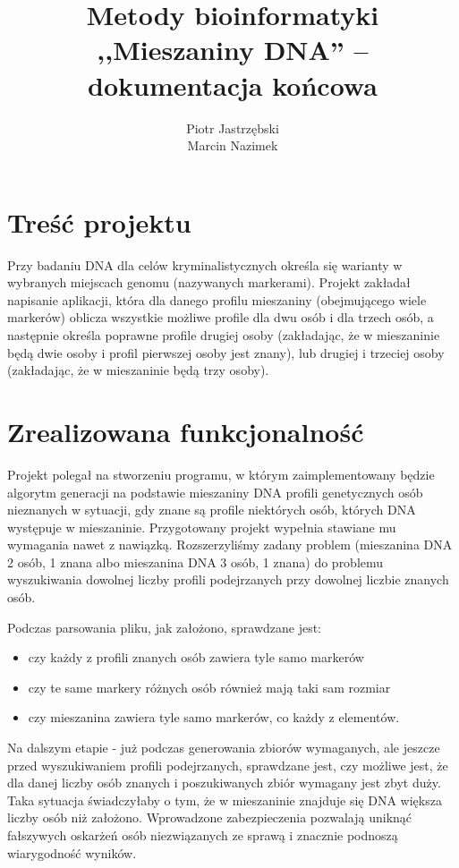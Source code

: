 \documentclass[11pt,a4paper]{article}
\title{Metody bioinformatyki\\ ,,Mieszaniny DNA'' -- dokumentacja końcowa}
\author{Piotr Jastrzębski\\ Marcin Nazimek}
\date{}
\begin{document}
\maketitle

\section{Treść projektu}
Przy badaniu DNA dla celów kryminalistycznych określa się warianty w wybranych miejscach genomu (nazywanych markerami). Projekt zakładał napisanie aplikacji, która dla danego profilu mieszaniny (obejmującego wiele markerów) oblicza wszystkie możliwe profile dla dwu osób i dla trzech osób, a następnie określa poprawne profile drugiej osoby (zakładając, że w mieszaninie będą dwie osoby i profil pierwszej osoby jest znany), lub drugiej i trzeciej osoby (zakładając, że w mieszaninie będą trzy osoby).

\section{Zrealizowana funkcjonalność}
Projekt polegał na stworzeniu programu, w którym zaimplementowany będzie algorytm generacji na podstawie mieszaniny DNA profili genetycznych osób nieznanych w sytuacji, gdy znane są profile niektórych osób, których DNA występuje w mieszaninie. Przygotowany projekt wypełnia stawiane mu wymagania nawet z nawiązką. Rozszerzyliśmy zadany problem (mieszanina DNA 2 osób, 1 znana albo mieszanina DNA 3 osób, 1 znana) do problemu wyszukiwania dowolnej liczby profili podejrzanych przy dowolnej liczbie znanych osób. 

Podczas parsowania pliku, jak założono, sprawdzane jest:
\begin{itemize}
\item czy każdy z profili znanych osób zawiera tyle samo markerów
\item czy te same markery różnych osób również mają taki sam rozmiar
\item czy mieszanina zawiera tyle samo markerów, co każdy z elementów.
\end{itemize}
Na dalszym etapie - już podczas generowania zbiorów wymaganych, ale jeszcze przed wyszukiwaniem profili podejrzanych, sprawdzane jest, czy możliwe jest, że dla danej liczby osób znanych i poszukiwanych zbiór wymagany jest zbyt duży. Taka sytuacja świadczyłaby o tym, że w mieszaninie znajduje się DNA większa liczby osób niż założono. Wprowadzone zabezpieczenia pozwalają uniknąć fałszywych oskarżeń osób niezwiązanych ze sprawą i znacznie podnoszą wiarygodność wyników.
\end{document}
